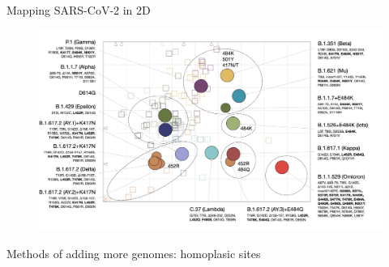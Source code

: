 \documentclass{beamer}
\begin{document}
\begin{frame}{Mapping SARS-CoV-2 in 2D}
    \begin{figure}
    \includegraphics[width=\textwidth]{sars_cov_2_map/wilks_3.png}
\end{figure}   
\centering
\vfill
\tiny{\cite{wilksMappingSARSCoV2Antigenic2022}}
\end{frame}

\begin{frame}{Methods of adding more genomes: homoplasic sites}
    \begin{figure}
        \centering
        \scalebox{1.1}{
        
        }
    \end{figure}
    \centering
    \vfill
    \tiny{\cite{page2009molecular}}
\end{frame}
\end{document}
